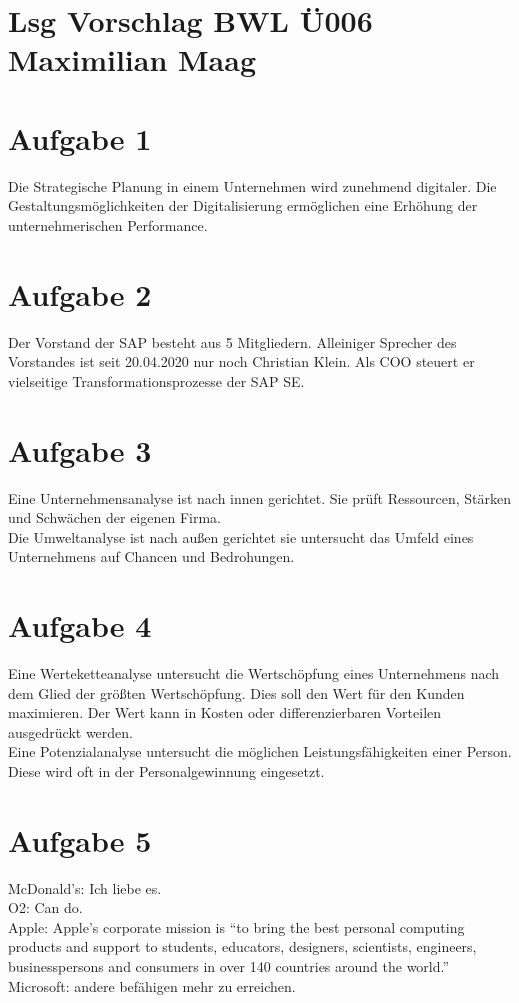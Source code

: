 \documentclass{article}
\begin{document}
	\section*{Lsg Vorschlag BWL Ü006 Maximilian Maag}
	\section*{Aufgabe 1}
	Die Strategische Planung in einem Unternehmen wird zunehmend digitaler. Die Gestaltungsmöglichkeiten der Digitalisierung ermöglichen eine Erhöhung der unternehmerischen Performance.
	\section*{Aufgabe 2}
	Der Vorstand der SAP besteht aus 5 Mitgliedern. Alleiniger Sprecher des Vorstandes ist seit 20.04.2020 nur noch Christian Klein. Als COO steuert er vielseitige Transformationsprozesse der SAP SE.
	\section*{Aufgabe 3}
	Eine Unternehmensanalyse ist nach innen gerichtet. Sie prüft Ressourcen, Stärken und Schwächen der eigenen Firma. \\
	Die Umweltanalyse ist nach außen gerichtet sie untersucht das Umfeld eines Unternehmens auf Chancen und Bedrohungen.
	\section*{Aufgabe 4}
	Eine Werteketteanalyse untersucht die Wertschöpfung eines Unternehmens nach dem Glied der größten Wertschöpfung. Dies soll den Wert für den Kunden maximieren. Der Wert kann in Kosten oder differenzierbaren Vorteilen ausgedrückt werden. \\
	Eine Potenzialanalyse untersucht die möglichen Leistungsfähigkeiten einer Person. Diese wird oft in der Personalgewinnung eingesetzt.
	\section*{Aufgabe 5}
	McDonald's: Ich liebe es. \\
	O2: Can do. \\
	Apple: Apple’s corporate mission is “to bring the best personal computing products and support to students, educators, designers, scientists, engineers, businesspersons and consumers in over 140 countries around the world.” \\
	Microsoft: andere befähigen mehr zu erreichen.
\end{document}
